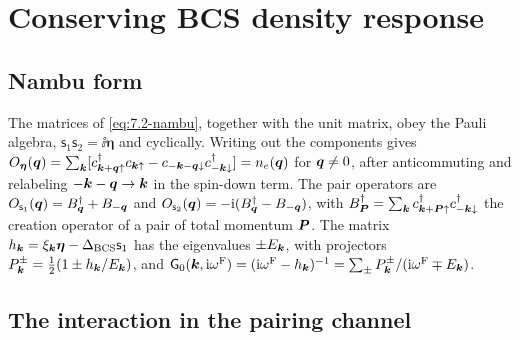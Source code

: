\section{Conserving BCS density response}\label{app:D.21}

\subsection*{Nambu form}

The matrices of \cref{eq:7.2-nambu}, together with the unit matrix, obey the Pauli algebra, $\mathsf{s}_1\mathsf{s}_2 = \ii\boldsymbol{\eta}$ and cyclically. Writing out the components gives $O_{\boldsymbol{\eta}}(\bm{q}) = \sum_{\bm{k}}[c^\dagger_{\bm{k}+\bm{q}\uparrow}c_{\bm{k}\uparrow} - c_{-\bm{k}-\bm{q}\downarrow}c^\dagger_{-\bm{k}\downarrow}] = n_e(\bm{q})$ for $\bm{q} \ne 0$, after anticommuting and relabeling $-\bm{k} - \bm{q} \to \bm{k}$ in the spin-down term. The pair operators are $O_{\mathsf{s}_1}(\bm{q}) = B^\dagger_{\bm{q}} + B_{-\bm{q}}$ and $O_{\mathsf{s}_2}(\bm{q}) = -\mathrm{i}(B^\dagger_{\bm{q}} - B_{-\bm{q}})$, with $B^\dagger_{\bm{P}} = \sum_{\bm{k}}c^\dagger_{\bm{k}+\bm{P}\uparrow}c^\dagger_{-\bm{k}\downarrow}$ the creation operator of a pair of total momentum $\bm{P}$. The matrix $h_{\bm{k}} = \xi_{\bm{k}}\boldsymbol{\eta} - \Delta_{\mathrm{BCS}}\mathsf{s}_1$ has the eigenvalues $\pm E_{\bm{k}}$, with projectors $P^\pm_{\bm{k}} = \frac12(1 \pm h_{\bm{k}}/E_{\bm{k}})$, and $\mathsf{G}_0(\bm{k},\mathrm{i}\omega^{\mathrm{F}}) = (\mathrm{i}\omega^{\mathrm{F}} - h_{\bm{k}})^{-1} = \sum_\pm P^\pm_{\bm{k}}/(\mathrm{i}\omega^{\mathrm{F}} \mp E_{\bm{k}})$.

\subsection*{The interaction in the pairing channel}

